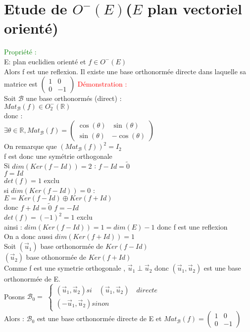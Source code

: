 \documentclass{article}
\begin{document}
\section{Etude de $O^-(E)$($E$ plan vectoriel orienté)}
\textcolor{green}{Propriété :} \\
E: plan euclidien orienté et  $f \in O^-(E)$ \\
Alors f est une reflexion. Il existe une base orthonormée directe dans laquelle sa matrice est $\begin{pmatrix}
1 & 0 \\
0 & -1
\end{pmatrix}$
\textcolor{red}{Démonstration :} \\
Soit $\mathcal B$ une base orthonormés (direct) : \\
$Mat_{\mathcal B}(f) \in O_2^-(\mathbb R)$ \\
donc : \\
$\exists \theta \in \mathbb R, Mat_{\mathcal B}(f)=\begin{pmatrix}
\cos(\theta) & \sin(\theta) \\
\sin(\theta) & - \cos(\theta)
\end{pmatrix}$ \\
On remarque que $(Mat_{\mathcal B}(f))^2=I_2$ \\
f est donc une symétrie orthogonale \\
Si $dim(Ker(f-Id))=2$ : $f-Id=\tilde 0$ \\
$f=Id$ \\
$det(f)=1$ exclu \\
si $dim(Ker(f-Id))=0$ : \\
$E=Ker(f-Id) \oplus Ker(f+Id)$ \\
donc $f+Id= \tilde 0$ $f=-Id$ \\
$det(f)=(-1)^2=1$ exclu \\
ainsi : $dim(Ker(f-Id))=1=dim(E)-1$ donc f est une reflexion \\
On a donc aussi $dim(Ker(f+Id))=1$ \\
Soit $(\vec u_1)$ base orthonormée de $Ker(f-Id)$ \\
$(\vec u_2)$ base othonormée de $Ker(f+Id)$ \\
Comme f est une symetrie orthogonale , $\vec u_1 \perp \vec u_2$ donc $(\vec u_1,\vec u_2)$ est une base orthonormée de E. \\
Posons $\mathcal B_0=$ $ \left\{\begin{array}{l}
( \vec u_1,\vec u_2) si \quad  (\vec u_1,\vec u_2)  \quad  directe \\
(- \vec u_1,\vec u_2) sinon
\end{array} \right. $ \\
Alors : $\mathcal B_0$ est une base orthonormée directe de E et $Mat_{\mathcal B}(f)=\begin{pmatrix}
1 & 0 \\
0 & -1
\end{pmatrix}$
\end{document}
